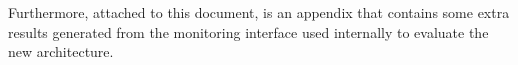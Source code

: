 Furthermore, attached to this document, is an appendix that contains some extra results generated from the monitoring interface used internally to evaluate the new architecture.












